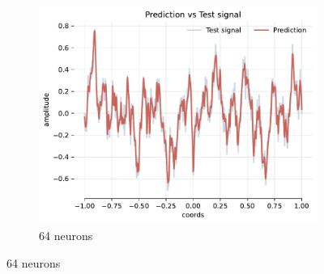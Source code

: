 \begin{figure}[!h]
    \begin{subfigure}[b]{0.32\textwidth}
        \centering
        \includegraphics[width=\textwidth]{img/ch3/pred-noise-1hl-64hf-w8.pdf}
        \caption{64 neurons}
        \label{fig:pred-noise-1hl-64hf-w8}
    \end{subfigure}


\end{figure}
